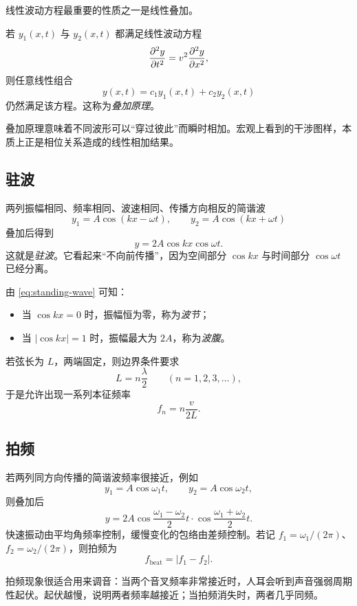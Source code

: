 线性波动方程最重要的性质之一是线性叠加。

\begin{law}
若 $y_1(x,t)$ 与 $y_2(x,t)$ 都满足线性波动方程
\[
\pdv[2]{y}{t}=v^2\pdv[2]{y}{x},
\]
则任意线性组合
\[
y(x,t)=c_1y_1(x,t)+c_2y_2(x,t)
\]
仍然满足该方程。这称为\emph{叠加原理}。
\end{law}

叠加原理意味着不同波形可以“穿过彼此”而瞬时相加。宏观上看到的干涉图样，本质上正是相位关系造成的线性相加结果。

\subsection{驻波}

两列振幅相同、频率相同、波速相同、传播方向相反的简谐波
\[
y_1=A\cos(kx-\omega t),
\qquad
y_2=A\cos(kx+\omega t)
\]
叠加后得到
\begin{equation}
 y=2A\cos kx\cos\omega t.
\label{eq:standing-wave}
\end{equation}
这就是\emph{驻波}。它看起来“不向前传播”，因为空间部分 $\cos kx$ 与时间部分 $\cos\omega t$ 已经分离。

由 \eqref{eq:standing-wave} 可知：
\begin{itemize}
  \item 当 $\cos kx=0$ 时，振幅恒为零，称为\emph{波节}；
  \item 当 $|\cos kx|=1$ 时，振幅最大为 $2A$，称为\emph{波腹}。
\end{itemize}

若弦长为 $L$，两端固定，则边界条件要求
\[
L=n\frac{\lambda}{2}
\qquad (n=1,2,3,\dots),
\]
于是允许出现一系列本征频率
\[
f_n=n\frac{v}{2L}.
\]

\subsection{拍频}

若两列同方向传播的简谐波频率很接近，例如
\[
y_1=A\cos\omega_1 t,
\qquad
y_2=A\cos\omega_2 t,
\]
则叠加后
\begin{equation}
 y=2A\cos\frac{\omega_1-\omega_2}{2}t\cdot \cos\frac{\omega_1+\omega_2}{2}t.
\label{eq:beat}
\end{equation}
快速振动由平均角频率控制，缓慢变化的包络由差频控制。若记 $f_1=\omega_1/(2\pi)$、$f_2=\omega_2/(2\pi)$，则拍频为
\[
f_{\text{beat}}=|f_1-f_2|.
\]

\begin{remark}
拍频现象很适合用来调音：当两个音叉频率非常接近时，人耳会听到声音强弱周期性起伏。起伏越慢，说明两者频率越接近；当拍频消失时，两者几乎同频。
\end{remark}

